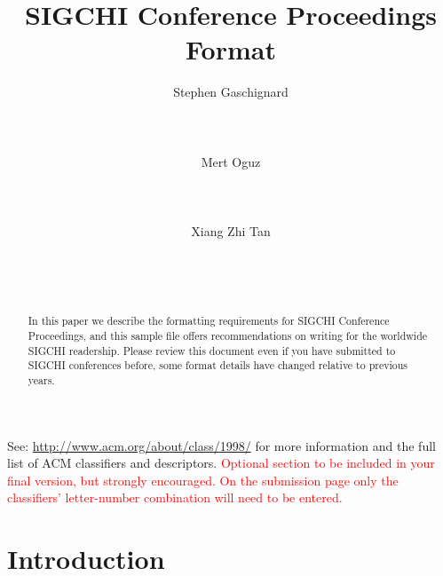 \documentclass{sigchi}
\begin{document}
\title{SIGCHI Conference Proceedings Format}

\author{
  \alignauthor  Stephen Gaschignard\\
    \\
    \\
    \\
  \alignauthor Mert Oguz\\
    \\
    \\
    \\    
  \alignauthor Xiang Zhi Tan\\
    \\
    \\
    \\
}

\maketitle

\begin{abstract}
In this paper we describe the formatting requirements for
SIGCHI Conference Proceedings, and this sample file
offers recommendations on writing for the worldwide
SIGCHI readership. Please review this document even if
you have submitted to SIGCHI conferences before, some
format details have changed relative to previous years.
\end{abstract}



See: \url{http://www.acm.org/about/class/1998/}
for more information and the full list of ACM classifiers
and descriptors. \newline
\textcolor{red}{Optional section to be included in your final version, 
but strongly encouraged. On the submission page only the classifiers’ 
letter-number combination will need to be entered.}

\section{Introduction}
\end{document}
